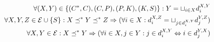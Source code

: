 \begin{align}
%
\forall (X,Y) \in 
\myset{
({\COURSES},{\COURSE}),
({\COURSE},{\PART}),
({\PART},{\CLASS}),
({\CLASS},{\SESSION})
}:
Y=
\setpartition{i}{X}{\map{X}{Y}{i}} 
\label{model:hierarchy}
\\
%
\forall X,Y,Z \in {\TYPE}\cup\myset{\SESSION}:
X\preceq^{*} Y\preceq^{*} Z 
\Rightarrow 
(\forall i \in X:
\map{X}{Z}{i}=\setpartition{j}{\map{X}{Y}{i}}{\map{Y}{Z}{j}}
\label{model:transitivity})
\\
%
\forall X,Y \in {\TYPE}:
X\preceq^{*} Y 
\Rightarrow 
(\forall i \in X, j \in Y:
j \in \map{X}{Y}{i} \Leftrightarrow i \in \map{Y}{X}{j}
)
\label{model:inverse}
\end{align}



